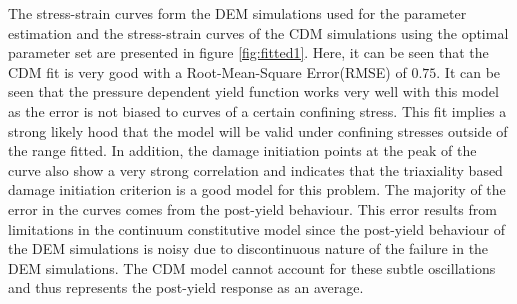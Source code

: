 The stress-strain curves form the DEM simulations used for the parameter estimation and the stress-strain curves of the CDM simulations using the optimal parameter set are presented in figure \ref{fig:fitted1}. Here, it can be seen that the CDM fit is very good with a Root-Mean-Square Error(RMSE) of $0.75$. It can be seen that the pressure dependent yield function works very well with this model as the error is not biased to curves of a certain confining stress. This fit implies a strong likely hood that the model will be valid under confining stresses outside of the range fitted. In addition, the damage initiation points at the peak of the curve also show a very strong correlation and indicates that the triaxiality based damage initiation criterion is a good model for this problem. The majority of the error in the curves comes from the post-yield behaviour. This error results from limitations in the continuum constitutive model since the post-yield behaviour of the DEM simulations is noisy due to discontinuous nature of the failure in the DEM simulations. The CDM model cannot account for these subtle oscillations and thus represents the post-yield response as an average. 
